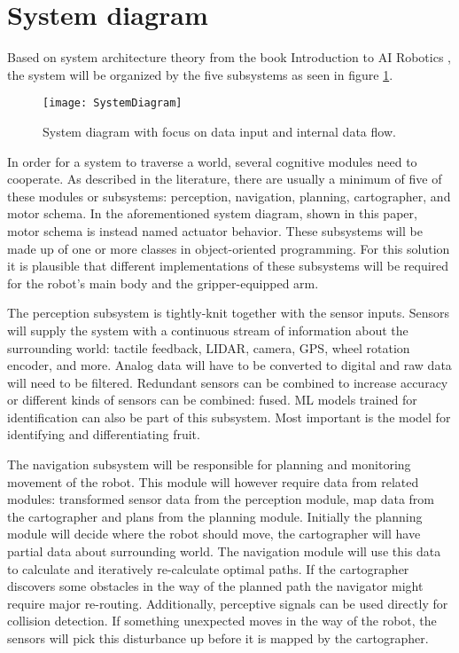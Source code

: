 \documentclass[%
oneside,    %
project,    %
nosummary   %
]{USN-MSc}
\begin{document}
\section{System diagram}
Based on system architecture theory from the book Introduction to AI Robotics \cite{murphy2000introduction}, the system will be organized by the five subsystems as seen in figure \ref{fig:sysDiagram}.
\begin{figure}[!ht]
  \centering
  \texttt{[image: SystemDiagram]}
  \caption{System diagram with focus on data input and internal data flow. \cite{murphy2000introduction}}
  \label{fig:sysDiagram}
\end{figure}
In order for a system to traverse a world, several cognitive modules need to cooperate. As described in the literature, there are usually a minimum of five of these modules or subsystems: perception, navigation, planning, cartographer, and motor schema. In the aforementioned system diagram, shown in this paper, motor schema is instead named actuator behavior. These subsystems will be made up of one or more classes in object-oriented programming. For this solution it is plausible that different implementations of these subsystems will be required for the robot's main body and the gripper-equipped arm.

The perception subsystem is tightly-knit together with the sensor inputs. Sensors will supply the system with a continuous stream of information about the surrounding world: tactile feedback, LIDAR, camera, GPS, wheel rotation encoder, and more. Analog data will have to be converted to digital and raw data will need to be filtered. Redundant sensors can be combined to increase accuracy or different kinds of sensors can be combined: fused. ML models trained for identification can also be part of this subsystem. Most important is the model for identifying and differentiating fruit.

The navigation subsystem will be responsible for planning and monitoring movement of the robot. This module will however require data from related modules: transformed sensor data from the perception module, map data from the cartographer and plans from the planning module. Initially the planning module will decide where the robot should move, the cartographer will have partial data about surrounding world. The navigation module will use this data to calculate and iteratively re-calculate optimal paths. If the cartographer discovers some obstacles in the way of the planned path the navigator might require major re-routing. Additionally, perceptive signals can be used directly for collision detection. If something unexpected moves in the way of the robot, the sensors will pick this disturbance up before it is mapped by the cartographer.
\end{document}
